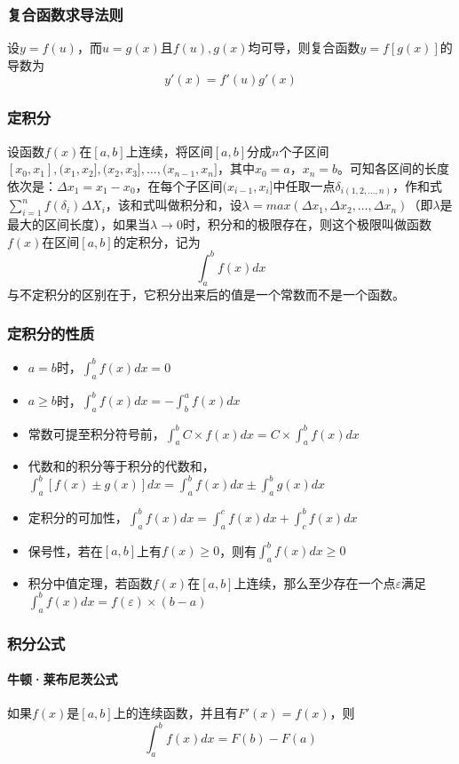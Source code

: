 \documentclass[UTF-8]{ctexart}
\begin{document}
			\subsubsection{复合函数求导法则}
			设$y=f(u)$，而$u=g(x)$且$f(u),g(x)$均可导，则复合函数$y=f[g(x)]$的导数为
			$$y'(x)=f'(u) g'(x)$$
			\subsubsection{定积分}
			设函数$f(x)$在$[a,b]$上连续，将区间$[a,b]$分成$n$个子区间$[x _ 0,x _ 1], (x _ 1,x _ 2], (x _ 2,x _ 3], …, (x _ {n-1},x _ n]$，其中$x _ 0=a，x _ n=b$。可知各区间的长度依次是：$\Delta x _ 1=x _ 1-x _ 0$，在每个子区间$(x _ {i-1},x _ i]$中任取一点$\delta  _ {i(1,2,...,n)}$，作和式$\sum _ {i=1}^{n}f(\delta _ i) \Delta X _ i$，该和式叫做积分和，设$\lambda=max(\Delta x _ 1, \Delta x _ 2, …, \Delta x _ n)$（即$\lambda$是最大的区间长度），如果当$\lambda→0$时，积分和的极限存在，则这个极限叫做函数$f(x)$在区间$[a,b]$的定积分，记为  
			$$\int _ {a}^{b} f(x)dx$$  
			与不定积分的区别在于，它积分出来后的值是一个常数而不是一个函数。
			\subsubsection{定积分的性质}
			\begin{itemize}
				\item $a=b$时，$\int _ a^b f(x)dx=0$
				\item $a \ge b$时，$\int _ a^b f(x)dx=-\int _ b^a f(x)dx$
				\item 常数可提至积分符号前，$\int _ a^b C \times f(x)dx=C \times \int _ a^b f(x)dx$
				\item 代数和的积分等于积分的代数和，$\int _ a^b [f(x)\pm g(x)]dx=\int _ a^b f(x)dx\pm\int _ a^b g(x)dx$
				\item 定积分的可加性，$\int _ a^b f(x)dx=\int _ a^c f(x)dx+\int _ c^b f(x)dx$
				\item 保号性，若在$[a,b]$上有$f(x) \ge 0$，则有$\int _ a^b f(x)dx \ge 0$
				\item 积分中值定理，若函数$f(x)$在$[a,b]$上连续，那么至少存在一个点$\varepsilon$满足$\int _ a^b f(x)dx=f(\varepsilon) \times (b-a)$
			\end{itemize}
			\subsubsection{积分公式}
			\paragraph{牛顿·莱布尼茨公式}如果$f(x)$是$[a,b]$上的连续函数，并且有$F'(x)=f(x)$，则$$\int _ a^b f(x)dx=F(b)-F(a)$$
\end{document}
